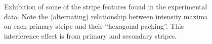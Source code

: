 \begin{figure}
\centering
{}
\caption{Exhibition of some of the stripe features found in the
experimental data.  Note the (alternating) relationship between intensity
maxima on each primary stripe and their ``hexagonal packing''. This
interference effect is from primary and secondary stripes.}
\label{fig:hexagonalpacking2}
\end{figure}
